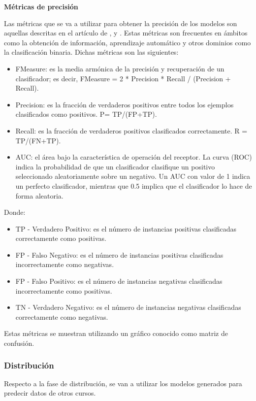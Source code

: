 \textbf{Métricas de precisión}

Las métricas que se va a utilizar para obtener la precisión de los modelos son aquellas descritas en el artículo de  ,  y . Estas métricas son frecuentes en ámbitos como la obtención de información, aprendizaje automático y otros dominios como la clasificación binaria. Dichas métricas son las siguientes:

\begin{itemize}
	\item FMeasure: es la media armónica de la precisión y recuperación de un clasificador; es decir, FMeasure = 2 * Precision * Recall / (Precision + Recall).
	\item Precision: es la fracción de verdaderos positivos entre todos los ejemplos clasificados como positivos. P= TP/(FP+TP).
	\item Recall: es la fracción de verdaderos positivos clasificados correctamente. R = TP/(FN+TP).
	\item AUC: el área bajo la característica de operación del receptor. La curva (ROC) indica la probabilidad de que un clasificador clasifique un positivo seleccionado aleatoriamente sobre un negativo. Un AUC con valor de 1 indica un perfecto clasificador, mientras que 0.5 implica que el clasificador lo hace de forma aleatoria.
\end{itemize}

Donde:
\begin{itemize}
	\item TP - Verdadero Positivo: es el número de instancias positivas clasificadas correctamente como positivas. 
	\item FP - Falso Negativo: es el número de instancias positivas clasificadas incorrectamente como negativas.
	\item FP - Falso Positivo: es el número de instancias negativas clasificadas incorrectamente como positivas.
	\item TN - Verdadero Negativo: es el número de instancias negativas clasificadas correctamente como negativas.
\end{itemize}

Estas métricas se muestran utilizando un gráfico conocido como matriz de confusión.


\subsubsection{Distribución}
Respecto a la fase de distribución, se van a utilizar los modelos generados para predecir datos de otros cursos. 

